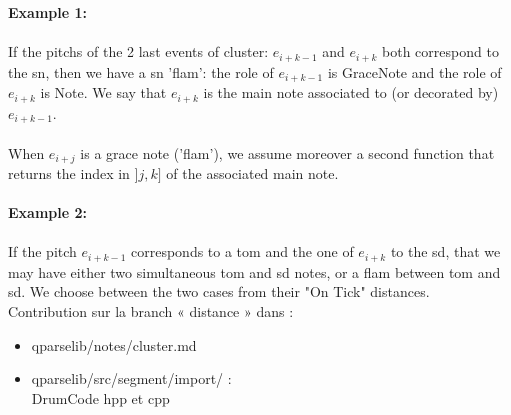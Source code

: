 \textbf{Example 1:}\\\\If the pitchs of the 2 last events of cluster: $e_{i+k-1}$ and $e_{i+k}$ both correspond to the sn, then we have a sn 'flam': the role of $e_{i+k-1}$ is GraceNote and the role of $e_{i+k}$ is Note. We say that $e_{i+k}$ is the main note associated to (or decorated by) $e_{i+k-1}$.\\\\
When $e_{i+j}$ is a grace note ('flam'), we assume moreover a second function that returns the index
in $]j,k]$ of the associated main note.\\\\

\textbf{Example 2:}\\\\If the pitch $e_{i+k-1}$ corresponds to a tom and the one of $e_{i+k}$ to the sd, that we may have either two simultaneous tom and sd notes, or a flam between tom and sd. We choose between the two cases from their "On Tick" distances.\\

Contribution sur la branch « distance » dans :\\
\begin{itemize}
	\item qparselib/notes/cluster.md
	\item qparselib/src/segment/import/ :\\
	      DrumCode hpp et cpp\\
\end{itemize}
\newpage